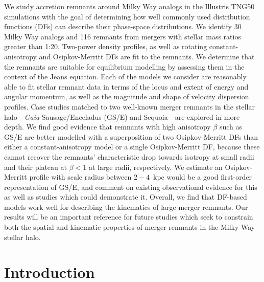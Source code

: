 We study accretion remnants around Milky Way analogs in the Illustris TNG50 simulations with the goal of determining how well commonly used distribution functions (DFs) can describe their phase-space distributions. We identify 30 Milky Way analogs and 116 remnants from mergers with stellar mass ratios greater than 1:20. Two-power density profiles, as well as rotating constant-anisotropy and Osipkov-Merritt DFs are fit to the remnants. We determine that the remnants are suitable for equilibrium modelling by assessing them in the context of the Jeans equation. Each of the models we consider are reasonably able to fit stellar remnant data in terms of the locus and extent of energy and angular momentum, as well as the magnitude and shape of velocity dispersion profiles. Case studies matched to two well-known merger remnants in the stellar halo---\textit{Gaia}-Sausage/Enceladus (GS/E) and Sequoia---are explored in more depth. We find good evidence that remnants with high anisotropy $\beta$ such as GS/E are better modelled with a superposition of two Osipkov-Merritt DFs than either a constant-anisotropy model or a single Osipkov-Merritt DF, because these cannot recover the remnants' characteristic drop towards isotropy at small radii and their plateau at $\beta < 1$ at large radii, respectively. We estimate an Osipkov-Merritt profile with scale radius between $2-4$~kpc would be a good first-order representation of GS/E, and comment on existing observational evidence for this as well as studies which could demonstrate it. Overall, we find that DF-based models work well for describing the kinematics of large merger remnants. Our results will be an important reference for future studies which seek to constrain both the spatial and kinematic properties of merger remnants in the Milky Way stellar halo.




\section{Introduction}
\label{ch4:sec:introduction}

